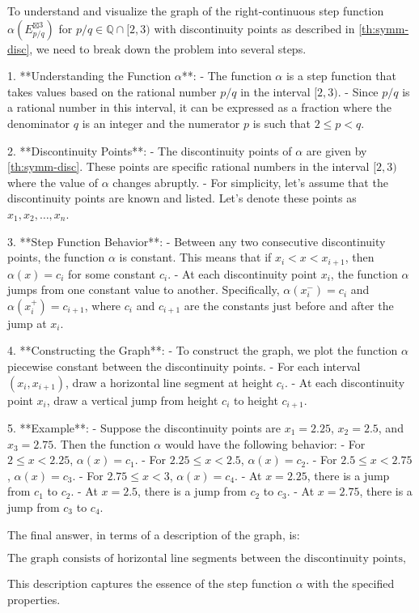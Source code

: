 To understand and visualize the graph of the right-continuous step function \(\alpha(E_{p/q}^{\boxtimes 3})\) for \(p/q \in \mathbb{Q} \cap [2,3)\) with discontinuity points as described in \autoref{th:symm-disc}, we need to break down the problem into several steps.

1. **Understanding the Function \(\alpha\)**:
   - The function \(\alpha\) is a step function that takes values based on the rational number \(p/q\) in the interval \([2, 3)\).
   - Since \(p/q\) is a rational number in this interval, it can be expressed as a fraction where the denominator \(q\) is an integer and the numerator \(p\) is such that \(2 \leq p < q\).

2. **Discontinuity Points**:
   - The discontinuity points of \(\alpha\) are given by \autoref{th:symm-disc}. These points are specific rational numbers in the interval \([2, 3)\) where the value of \(\alpha\) changes abruptly.
   - For simplicity, let's assume that the discontinuity points are known and listed. Let's denote these points as \(x_1, x_2, \ldots, x_n\).

3. **Step Function Behavior**:
   - Between any two consecutive discontinuity points, the function \(\alpha\) is constant. This means that if \(x_i < x < x_{i+1}\), then \(\alpha(x) = c_i\) for some constant \(c_i\).
   - At each discontinuity point \(x_i\), the function \(\alpha\) jumps from one constant value to another. Specifically, \(\alpha(x_i^-) = c_i\) and \(\alpha(x_i^+) = c_{i+1}\), where \(c_i\) and \(c_{i+1}\) are the constants just before and after the jump at \(x_i\).

4. **Constructing the Graph**:
   - To construct the graph, we plot the function \(\alpha\) piecewise constant between the discontinuity points.
   - For each interval \((x_i, x_{i+1})\), draw a horizontal line segment at height \(c_i\).
   - At each discontinuity point \(x_i\), draw a vertical jump from height \(c_i\) to height \(c_{i+1}\).

5. **Example**:
   - Suppose the discontinuity points are \(x_1 = 2.25\), \(x_2 = 2.5\), and \(x_3 = 2.75\). Then the function \(\alpha\) would have the following behavior:
     - For \(2 \leq x < 2.25\), \(\alpha(x) = c_1\).
     - For \(2.25 \leq x < 2.5\), \(\alpha(x) = c_2\).
     - For \(2.5 \leq x < 2.75\), \(\alpha(x) = c_3\).
     - For \(2.75 \leq x < 3\), \(\alpha(x) = c_4\).
   - At \(x = 2.25\), there is a jump from \(c_1\) to \(c_2\).
   - At \(x = 2.5\), there is a jump from \(c_2\) to \(c_3\).
   - At \(x = 2.75\), there is a jump from \(c_3\) to \(c_4\).

The final answer, in terms of a description of the graph, is:

\[
\boxed{\text{The graph consists of horizontal line segments between the discontinuity points, with vertical jumps at each discontinuity point.}}
\]

This description captures the essence of the step function \(\alpha\) with the specified properties.
